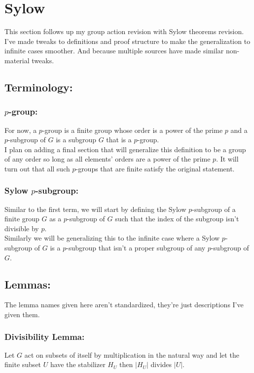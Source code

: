 
\section{Sylow}
This section follows up my group action revision with Sylow theorems revision.
I've made tweaks to definitions and proof structure to make the generalization to infinite cases smoother.
And because multiple sources have made similar non-material tweaks.

\subsection{Terminology:} 
\subsubsection{$p$-group:}
For now,
a $p$-group is a finite group whose order is a power of the prime $p$ and a $p$-subgroup of $G$ is a subgroup $G$ that is a $p$-group.
\\

I plan on adding a final section that will generalize this definition to be a group of any order so long as all elements' orders are a power of the prime $p$.
It will turn out that all such $p$-groups that are finite satisfy the original statement.

\subsubsection{Sylow $p$-subgroup:}
Similar to the first term,
we will start by defining the Sylow $p$-subgroup of a finite group $G$ as a $p$-subgroup of $G$ such that the index of the subgroup isn't divisible by $p$.
\\

Similarly we will be generalizing this to the infinite case where a Sylow $p$-subgroup of $G$ is a $p$-subgroup that isn't a proper subgroup of any $p$-subgroup of $G$.

\subsection{Lemmas:}
The lemma names given here aren't standardized,
they're just descriptions I've given them.

\subsubsection{Divisibility Lemma:}
Let $G$ act on subsets of itself by multiplication in the natural way and let the finite subset $U$ have the stabilizer $H_U$ then $|H_U|$ divides $|U|$.
\\

